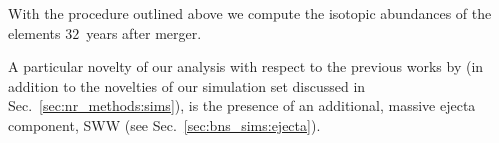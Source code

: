 









With the procedure outlined above we compute the isotopic abundances of 
the \rproc{} elements $32$~years after merger. 

A particular novelty of our analysis with respect to the previous works by
\citet{Radice:2016dwd,Radice:2018pdn} (in addition to the novelties of our simulation set 
discussed in Sec.~\ref{sec:nr_methods:sims}), is the presence of an additional, massive 
ejecta component, \ac{SWW} (see Sec.~\ref{sec:bns_sims:ejecta}).


